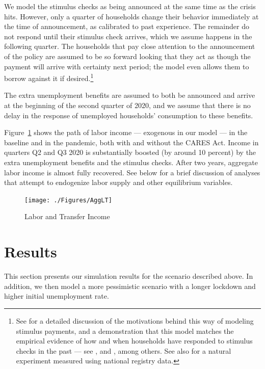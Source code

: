 \documentclass[titlepage,a4paper]{\econtex}
\begin{document}
We model the stimulus checks as being announced at the same time as the crisis hits.
However, only a quarter of households change their behavior immediately at the time of announcement, as calibrated to past experience.
The remainder do not respond until their stimulus check arrives, which we assume happens in the following quarter.
The households that pay close attention to the announcement of the policy are assumed to be so forward looking that they act as though the payment will arrive with certainty next period; the model even allows them to borrow against it if desired.\footnote{See \cite{carroll_sticky_2020} for a detailed discussion of the motivations behind this way of modeling stimulus payments, and a demonstration that this model matches the empirical evidence of how and when households have responded to stimulus checks in the past --- see \cite{psjmMPC2008}, \cite{brodaParker} and \cite{parker25million}, among others.  See also \cite{fhnMPC} for a natural experiment measured using national registry data.}

The extra unemployment benefits are assumed to both be announced and arrive at the beginning of the second quarter of 2020, and we assume that there is no delay in the response of unemployed households' consumption to these benefits.

\hypertarget{labor-income}{}
Figure~\ref{labor_income} shows the path of labor income --- exogenous in our model --- in the baseline and in the pandemic, both with and without the CARES Act.
Income in quarters Q2 and Q3 2020 is substantially boosted (by around 10 percent) by the extra unemployment benefits and the stimulus checks.
After two years, aggregate labor income is almost fully recovered.  See below for a brief discussion of analyses that attempt to endogenize labor supply and other equilibrium variables.

\begin{figure}
  \centering
  \caption{Labor and Transfer Income}
  \label{labor_income}
  { \texttt{[image: ./Figures/AggLT]}}
\end{figure}


\hypertarget{Results}{}
\section{Results}

This section presents our simulation results for the scenario described above. In addition, we then model a more pessimistic scenario with a longer lockdown and higher initial unemployment rate.
\hypertarget{cons-response}{}
\end{document}
